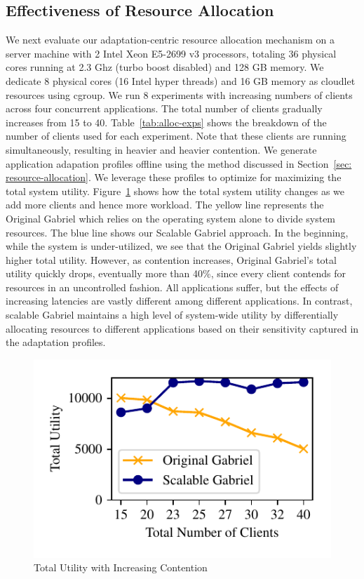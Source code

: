 \subsection{Effectiveness of Resource Allocation}

We next evaluate our adaptation-centric resource allocation mechanism on a
server machine with 2 Intel{\textregistered} Xeon{\textregistered} E5-2699 v3
processors, totaling 36 physical cores running at 2.3 Ghz (turbo boost disabled)
and 128 GB memory. We dedicate 8 physical cores (16 Intel{\textregistered} hyper
threads) and 16 GB memory as cloudlet resources using cgroup. We run 8
experiments with increasing numbers of clients across four concurrent
applications. The total number of clients gradually increases from 15 to 40.
Table~\ref{tab:alloc-exps} shows the breakdown of the number of clients used for
each experiment. Note that these clients are running simultaneously, resulting
in heavier and heavier contention. We generate application adapation profiles
offline using the method discussed in Section~\ref{sec: resource-allocation}. We
leverage these profiles to optimize for maximizing the total system utility.
Figure~\ref{fig:alloc-max-util} shows how the total system utility changes as we
add more clients and hence more workload. The yellow line represents the
Original Gabriel which relies on the operating system alone to divide system
resources. The blue line shows our Scalable Gabriel approach. In the beginning,
while the system is under-utilized, we see that the Original Gabriel yields
slightly higher total utility. However, as contention increases, Original
Gabriel's total utility quickly drops, eventually more than 40\%, since every
client contends for resources in an uncontrolled fashion.  All applications
suffer, but the effects of increasing latencies are vastly different among
different applications. In contrast, scalable Gabriel maintains a high level of
system-wide utility by differentially allocating resources to different
applications based on their sensitivity captured in the adaptation profiles.

\begin{figure}[h]
  \centering
  \includegraphics[width=.9\linewidth]{FIGS/fig-alloc-max-util.pdf}
  \caption{Total Utility with Increasing Contention}
  \label{fig:alloc-max-util}
\end{figure}


